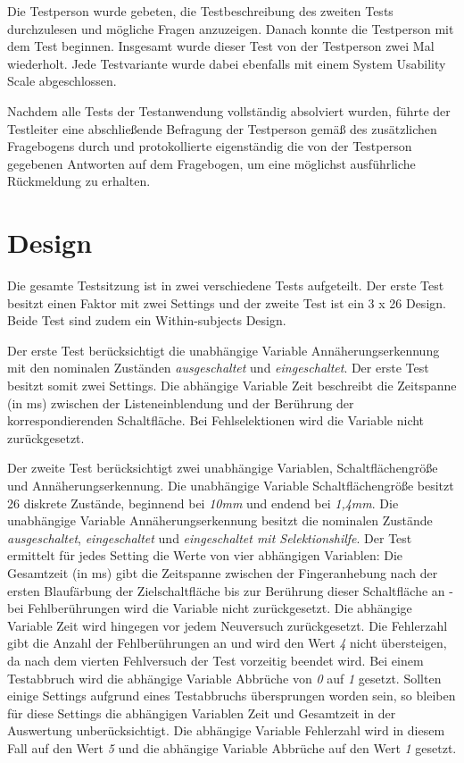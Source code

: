 \documentclass[12pt,numbers=noenddot,parskip,bibliography=totocnumbered,listof=totocnumbered]{scrreprt}
\begin{document}
Die Testperson wurde gebeten, die Testbeschreibung des zweiten Tests durchzulesen und mögliche Fragen anzuzeigen. Danach konnte die Testperson mit dem Test beginnen. Insgesamt wurde dieser Test von der Testperson zwei Mal wiederholt. Jede Testvariante wurde dabei ebenfalls mit einem System Usability Scale abgeschlossen.

Nachdem alle Tests der Testanwendung vollständig absolviert wurden, führte der Testleiter eine abschließende Befragung der Testperson gemäß des zusätzlichen Fragebogens durch und protokollierte eigenständig die von der Testperson gegebenen Antworten auf dem Fragebogen, um eine möglichst ausführliche Rückmeldung zu erhalten. 

\section{Design}\label{sec:design}
Die gesamte Testsitzung ist in zwei verschiedene Tests aufgeteilt. Der erste Test besitzt einen Faktor mit zwei Settings und der zweite Test ist ein 3 x 26 Design. Beide Test sind zudem ein Within-subjects Design.

Der erste Test berücksichtigt die unabhängige Variable {\ttfamily Annäherungserkennung} mit den nominalen Zuständen \emph{ausgeschaltet} und \emph{eingeschaltet}. Der erste Test besitzt somit zwei Settings. Die abhängige Variable {\ttfamily Zeit} beschreibt die Zeitspanne (in ms) zwischen der Listeneinblendung und der Berührung der korrespondierenden Schaltfläche. Bei Fehlselektionen wird die Variable nicht zurückgesetzt.

Der zweite Test berücksichtigt zwei unabhängige Variablen, {\ttfamily Schaltflächengröße} und {\ttfamily Annäherungserkennung}. Die unabhängige Variable {\ttfamily Schaltflächengröße} besitzt 26 diskrete Zustände, beginnend bei \emph{10mm} und endend bei \emph{1,4mm}. Die unabhängige Variable {\ttfamily Annäherungserkennung} besitzt die nominalen Zustände \emph{ausgeschaltet}, \emph{eingeschaltet} und \emph{eingeschaltet mit Selektionshilfe}. Der Test ermittelt für jedes Setting die Werte von vier abhängigen Variablen: Die {\ttfamily Gesamtzeit} (in ms) gibt die Zeitspanne zwischen der Fingeranhebung nach der ersten Blaufärbung der Zielschaltfläche bis zur Berührung dieser Schaltfläche an - bei Fehlberührungen wird die Variable nicht zurückgesetzt. Die abhängige Variable {\ttfamily Zeit} wird hingegen vor jedem Neuversuch zurückgesetzt. Die {\ttfamily Fehlerzahl} gibt die Anzahl der Fehlberührungen an und wird den Wert \emph{4} nicht übersteigen, da nach dem vierten Fehlversuch der Test vorzeitig beendet wird. Bei einem Testabbruch wird die abhängige Variable {\ttfamily Abbrüche} von \emph{0} auf \emph{1} gesetzt. Sollten einige Settings aufgrund eines Testabbruchs übersprungen worden sein, so bleiben für diese Settings die abhängigen Variablen {\ttfamily Zeit} und {\ttfamily Gesamtzeit} in der Auswertung unberücksichtigt. Die abhängige Variable {\ttfamily Fehlerzahl} wird in diesem Fall auf den Wert \emph{5} und die abhängige Variable {\ttfamily Abbrüche} auf den Wert \emph{1} gesetzt.
\end{document}

